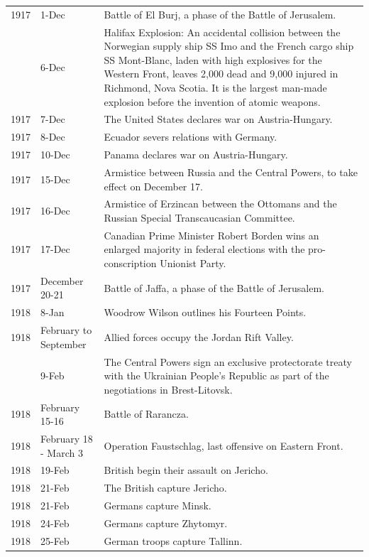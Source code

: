 \documentclass[
  openany]{book}
\begin{document}
\begin{longtable}[t]{rl>{\raggedright\arraybackslash}p{22em}}
\rowcolor{gray!6}  1917 & 1-Dec & Battle of El Burj, a phase of the Battle of Jerusalem.\\
\addlinespace
1917 & 6-Dec & Halifax Explosion: An accidental collision between the Norwegian supply ship SS Imo and the French cargo ship SS Mont-Blanc, laden with high explosives for the Western Front, leaves 2,000 dead and 9,000 injured in Richmond, Nova Scotia. It is the largest man-made explosion before the invention of atomic weapons.\\
\rowcolor{gray!6}  1917 & 7-Dec & The United States declares war on Austria-Hungary.\\
1917 & 8-Dec & Ecuador severs relations with Germany.\\
\rowcolor{gray!6}  1917 & 10-Dec & Panama declares war on Austria-Hungary.\\
1917 & 15-Dec & Armistice between Russia and the Central Powers, to take effect on December 17.\\
\addlinespace
\rowcolor{gray!6}  1917 & 16-Dec & Armistice of Erzincan between the Ottomans and the Russian Special Transcaucasian Committee.\\
1917 & 17-Dec & Canadian Prime Minister Robert Borden wins an enlarged majority in federal elections with the pro-conscription Unionist Party.\\
\rowcolor{gray!6}  1917 & December 20-21 & Battle of Jaffa, a phase of the Battle of Jerusalem.\\
1918 & 8-Jan & Woodrow Wilson outlines his Fourteen Points.\\
\rowcolor{gray!6}  1918 & February to September & Allied forces occupy the Jordan Rift Valley.\\
\addlinespace
1918 & 9-Feb & The Central Powers sign an exclusive protectorate treaty with the Ukrainian People's Republic as part of the negotiations in Brest-Litovsk.\\
\rowcolor{gray!6}  1918 & February 15-16 & Battle of Rarancza.\\
1918 & February 18 - March 3 & Operation Faustschlag, last offensive on Eastern Front.\\
\rowcolor{gray!6}  1918 & 19-Feb & British begin their assault on Jericho.\\
1918 & 21-Feb & The British capture Jericho.\\
\addlinespace
\rowcolor{gray!6}  1918 & 21-Feb & Germans capture Minsk.\\
1918 & 24-Feb & Germans capture Zhytomyr.\\
\rowcolor{gray!6}  1918 & 25-Feb & German troops capture Tallinn.\\

\end{longtable}
\end{document}
